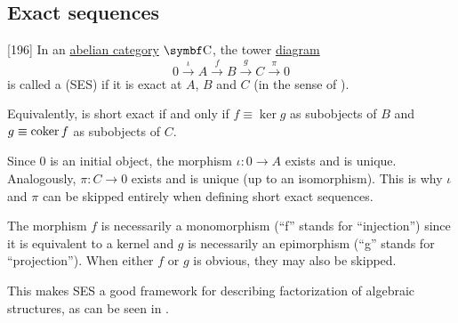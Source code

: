 \subsection{Exact sequences}\label{subsec:exact_sequences}

\begin{definition}\label{def:short_exact_sequence}\cite{MacLane1994}[196]
  In an \hyperref[def:abelian_category]{abelian category} \( \Cat{C} \), the tower \hyperref[def:tower_diagram]{diagram}
  \begin{equation}\label{def:short_exact_sequence/diagram}
    0
    \overset \iota \longrightarrow
    A
    \overset f \longrightarrow
    B
    \overset g \longrightarrow
    C
    \overset \pi \longrightarrow
    0
  \end{equation}
  is called a  (SES) if it is exact at \( A \), \( B \) and \( C \) (in the sense of ).

  Equivalently,  is short exact if and only if \( f \equiv \ker g \) as subobjects of \( B \) and \( g \equiv \operatorname{co}\!\ker f \) as subobjects of \( C \).
\end{definition}

\begin{remark}\label{remark:short_exact_sequence_factorization}
  Since \( 0 \) is an initial object, the morphism \( \iota: 0 \to A \) exists and is unique. Analogously, \( \pi: C \to 0 \) exists and is unique (up to an isomorphism). This is why \( \iota \) and \( \pi \) can be skipped entirely when defining short exact sequences.

  The morphism \( f \) is necessarily a monomorphism (\enquote{f} stands for \enquote{injection}) since it is equivalent to a kernel and \( g \) is necessarily an epimorphism (\enquote{g} stands for \enquote{projection}). When either \( f \) or \( g \) is obvious, they may also be skipped.

  This makes SES a good framework for describing factorization of algebraic structures, as can be seen in .
\end{remark}

